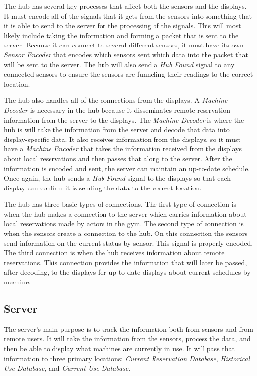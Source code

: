 \documentclass[PPFS.tex]{template/subfiles}
\newcommand{\sn}[1]{\textit{#1}}
\begin{document}
The hub has several key processes that affect both the sensors and the displays. It must encode all of the signals that it gets from the sensors into something that it is able to send to the server for the processing of the signals. This will most likely include taking the information and forming a packet that is sent to the server. Because it can connect to several different sensors, it must have its own \sn{Sensor Encoder} that encodes which sensors sent which data into the packet that will be sent to the server. The hub will also send a \sn{Hub Found} signal to any connected sensors to ensure the sensors are funneling their readings to the correct location.

The hub also handles all of the connections from the displays. A \sn{Machine Decoder} is necessary in the hub because it disseminates remote reservation information from the server to the displays. The \sn{Machine Decoder} is where the hub is will take the information from the server and decode that data into display-specific data. It also receives information from the displays, so it must have a \sn{Machine Encoder} that takes the information received from the displays about local reservations and then passes that along to the server. After the information is encoded and sent, the server can maintain an up-to-date schedule. Once again, the hub sends a \sn{Hub Found} signal to the displays so that each display can confirm it is sending the data to the correct location.

The hub has three basic types of connections. The first type of connection is when the hub makes a connection to the server which carries information about local reservations made by actors in the gym. The second type of connection is when the sensors create a connection to the hub. On this connection the sensors send information on the current status by sensor. This signal is properly encoded. The third connection is when the hub receives information about remote reservations. This connection provides the information that will later be passed, after decoding, to the displays for up-to-date displays about current schedules by machine.

\subsection{Server}

The server's main purpose is to track the information both from sensors and from remote users. It will take the information from the sensors, process the data, and then be able to display what machines are currently in use. It will pass that information to three primary locations: \textit{Current Reservation Database}, \textit{Historical Use Database}, and \textit{Current Use Database}.
\end{document}
